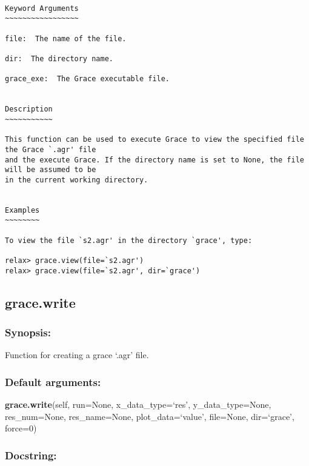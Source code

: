 {\scriptsize
\begin{verbatim}

Keyword Arguments
~~~~~~~~~~~~~~~~~

file:  The name of the file.

dir:  The directory name.

grace_exe:  The Grace executable file.


Description
~~~~~~~~~~~

This function can be used to execute Grace to view the specified file the Grace `.agr' file
and the execute Grace. If the directory name is set to None, the file will be assumed to be
in the current working directory.


Examples
~~~~~~~~

To view the file `s2.agr' in the directory `grace', type:

relax> grace.view(file=`s2.agr')
relax> grace.view(file=`s2.agr', dir=`grace')
\end{verbatim}
}



\newpage

\subsection{grace.write}


\subsubsection{Synopsis:}

Function for creating a grace `.agr' file.

\subsubsection{Default arguments:}

\textsf{\textbf{grace.write}(self, run=None, x\_data\_type=`res', y\_data\_type=None, res\_num=None, res\_name=None, plot\_data=`value', file=None, dir=`grace', force=0)
}


\subsubsection{Docstring:}

